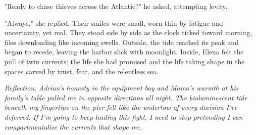 "Ready to chase thieves across the Atlantic?" he asked, attempting levity.

"Always," she replied. Their smiles were small, worn thin by fatigue and uncertainty, yet real. They stood side by side as the clock ticked toward morning, files downloading like incoming swells. Outside, the tide reached its peak and began to recede, leaving the harbor slick with moonlight. Inside, Elena felt the pull of twin currents: the life she had promised and the life taking shape in the spaces carved by trust, fear, and the relentless sea.


\noindent\textit{Reflection: Adrian's honesty in the equipment bay and Marco's warmth at his family's table pulled me in opposite directions all night. The bioluminescent tide beneath my fingertips on the pier felt like the undertow of every decision I've deferred. If I'm going to keep leading this fight, I need to stop pretending I can compartmentalize the currents that shape me.}
